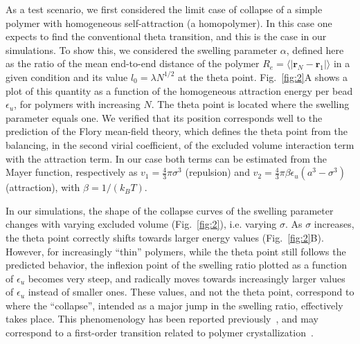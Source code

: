 \documentclass[
preprint,
a4paper,
12pt,
superscriptaddress,
pre]{revtex4}
\begin{document}
As a test scenario, we first considered the limit case of collapse of
a simple polymer with homogeneous self-attraction (a homopolymer). In
this case one expects to find the conventional theta transition, and
this  is the case in our simulations. To show this, we considered
the swelling parameter $\alpha$, defined here as the ratio of the mean
end-to-end distance of the polymer $R_e=\langle |\mathbf{r}_N -
\mathbf{r}_1| \rangle$ in a given condition and its value $l_0=
\lambda N^{1/2}$
at the theta point.  Fig.~\ref{fig:2}A shows a plot of this quantity
as a function of the homogeneous attraction energy per bead
$\epsilon_u$, for polymers with increasing $N$. The theta point is
located where the swelling parameter equals one.  We verified that its
position corresponds well to the prediction of the Flory mean-field
theory, which defines the theta point from the balancing, in the
second virial coefficient, of the excluded volume interaction term
with the attraction term. In our case both terms can be estimated from
the Mayer function, respectively as $v_1 = \frac{4}{3} \pi \sigma^3$
(repulsion) and $v_2=  \frac{4}{3} \pi \beta \epsilon_u (a^3 - \sigma^3)$
(attraction), with $\beta=1/(k_B T) $.


In our simulations, the shape of the collapse curves of the swelling
parameter changes with varying excluded volume (Fig.~\ref{fig:2}),
i.e. varying $\sigma$.  As $\sigma$ increases, the theta point
correctly shifts towards larger energy values (Fig.~\ref{fig:2}B).
However, for increasingly ``thin'' polymers, while the theta point
still follows the predicted behavior, the inflexion point of the
swelling ratio plotted as a function of $\epsilon_u$ becomes very
steep, and radically moves towards increasingly larger values of
$\epsilon_u$ instead of smaller ones. These values, and not the theta
point, correspond to where the ``collapse'', intended as a major jump
in the swelling ratio, effectively takes place.
This phenomenology has been reported previously~\cite{DeGennes1975},
and may correspond to a first-order transition related to polymer
crystallization~\cite{Taylor2009}.  
\end{document}
